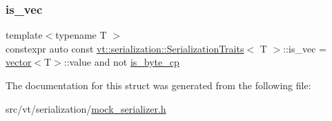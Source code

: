 \mbox{\label{structvt_1_1serialization_1_1_serialization_traits_a0b46991287a3bac546754a2332f33a82}} 
\subsubsection{\texorpdfstring{is\+\_\+vec}{is\_vec}}
{\footnotesize\ttfamily template$<$typename T $>$ \\
constexpr auto const \hyperlink{structvt_1_1serialization_1_1_serialization_traits}{vt\+::serialization\+::\+Serialization\+Traits}$<$ T $>$\+::is\+\_\+vec = \hyperlink{structvt_1_1serialization_1_1_serialization_traits_a44712948817caf3f18d61fba6f6c1a18}{vector}$<$T$>$\+::value and not \hyperlink{structvt_1_1serialization_1_1_serialization_traits_a38a97b8b969de14ff2893c1ebcb11aba}{is\+\_\+byte\+\_\+cp}\hspace{0.3cm}{\ttfamily [static]}}



The documentation for this struct was generated from the following file\+:\begin{DoxyCompactItemize}
\item 
src/vt/serialization/\hyperlink{mock__serializer_8h}{mock\+\_\+serializer.\+h}\end{DoxyCompactItemize}

